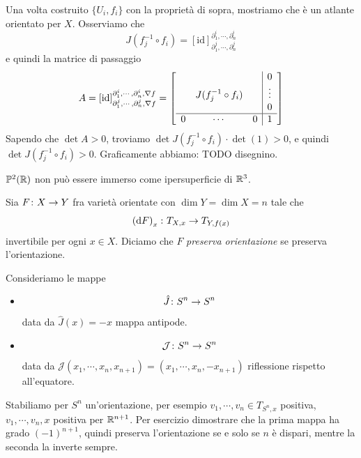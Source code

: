 \documentclass[a4paper]{article}
\begin{document}
\begin{snippetproof}{}
\begin{itemize}
    \end{itemize}
    Una volta costruito \(\{U_i, f_i\}\)
    con la proprietà di sopra,
    mostriamo che
    è un atlante orientato per \(X\).
    Osserviamo che \[
        J(f_j^{-1} \circ f_i)
        = \left[\text{id}\right]_{\partial_1^j, \cdots, \partial_n^j}^{\partial_1^i, \cdots, \partial_n^i}
    \]
    e quindi la matrice di passaggio
    \[
        A =  \left[\text{id}\right]_{\partial_1^j, \cdots, \partial_n^j, \nabla f}^{\partial_1^i, \cdots, \partial_n^i, \nabla f}
        = \left[
        \begin{array}{ccc|c}
            & & & 0 \\
            & J(f_j^{-1} \circ f_i) & & \vdots \\
            & & & 0 \\ \hline
            0 & \cdots & 0 & 1
        \end{array}
        \right]
    \]
    Sapendo che \(\det A >0\),
    troviamo \(\det J(f_j^{-1} \circ f_i) \cdot \det(1) > 0\),
    e quindi \(\det J(f_j^{-1} \circ f_i) > 0\).
    Graficamente abbiamo: TODO disegnino.
\end{snippetproof}

\begin{snippetcorollary}{}
    \(\mathbb P^2(\mathbb{R})\)
    non può essere immerso come ipersuperficie di \(\mathbb{R}^3\).
\end{snippetcorollary}

\begin{snippetdefinition}{}
    Sia \(F \colon X \to Y\)
    fra varietà orientate con \(\dim Y = \dim X = n\)
    tale che \[
        \left(\text dF\right)_x
        \colon T_{X,x} \to T_{Y,f(x)}
    \]
    invertibile per ogni \(x \in X\).
    Diciamo che \(F\)
    \emph{preserva orientazione}
    se preserva l'orientazione.
\end{snippetdefinition}

\begin{snippetexample}{}
    Consideriamo le mappe
    \begin{itemize}
        \item \[
            \hat J \colon S^n \to S^n
        \]
        data da \(\hat J(x) = -x\) mappa antipode.
        \item \[
            \mathcal J \colon S^n \to S^n
        \]
        data da \(\mathcal J(x_1, \cdots, x_n, x_{n+1}) = (x_1, \cdots, x_n, -x_{n+1})\)
        riflessione rispetto all'equatore.
    \end{itemize}
    Stabiliamo per \(S^n\) un'orientazione, per esempio
    \(v_1, \cdots, v_n \in T_{S^n, x}\) positiva,
    \(v_1, \cdots, v_n, x\) positiva per \(\mathbb{R}^{n+1}\).
    Per esercizio dimostrare che la prima mappa ha grado \((-1)^{n+1}\), quindi preserva
    l'orientazione se e solo se \(n\) è dispari, mentre la seconda la inverte sempre.
\end{snippetexample}
\end{document}
